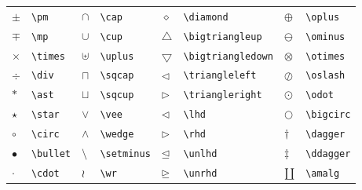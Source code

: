 \documentclass[fleqn]{profmat-cefet}
\begin{document}
\begin{spacing}{1}
\begin{longtable}{p{4mm}p{20mm}p{4mm}p{25mm}p{4mm}p{34mm}p{4mm}p{20mm}} \hline
  $\pm             $ & \lstinline!\pm!              &
  $\cap            $ & \lstinline!\cap!             &
  $\diamond        $ & \lstinline!\diamond!         &
  $\oplus          $ & \lstinline!\oplus!           \\
  $\mp             $ & \lstinline!\mp!              &
  $\cup            $ & \lstinline!\cup!             &
  $\bigtriangleup  $ & \lstinline!\bigtriangleup!   &
  $\ominus         $ & \lstinline!\ominus!          \\
  $\times          $ & \lstinline!\times!           &
  $\uplus          $ & \lstinline!\uplus!           &
  $\bigtriangledown$ & \lstinline!\bigtriangledown! &
  $\otimes         $ & \lstinline!\otimes!          \\
  $\div            $ & \lstinline!\div!             &
  $\sqcap          $ & \lstinline!\sqcap!           &
  $\triangleleft   $ & \lstinline!\triangleleft!    &
  $\oslash         $ & \lstinline!\oslash!          \\
  $\ast            $ & \lstinline!\ast!             &
  $\sqcup          $ & \lstinline!\sqcup!           &
  $\triangleright  $ & \lstinline!\triangleright!   &
  $\odot           $ & \lstinline!\odot!            \\
  $\star           $ & \lstinline!\star!            &
  $\vee            $ & \lstinline!\vee!             &
  $\lhd            $ & \lstinline!\lhd!             &
  $\bigcirc        $ & \lstinline!\bigcirc!         \\
  $\circ           $ & \lstinline!\circ!            &
  $\wedge          $ & \lstinline!\wedge!           &
  $\rhd            $ & \lstinline!\rhd!             &
  $\dagger         $ & \lstinline!\dagger!          \\
  $\bullet         $ & \lstinline!\bullet!          &
  $\setminus       $ & \lstinline!\setminus!        &
  $\unlhd          $ & \lstinline!\unlhd!           &
  $\ddagger        $ & \lstinline!\ddagger!         \\
  $\cdot           $ & \lstinline!\cdot!            &
  $\wr             $ & \lstinline!\wr!              &
  $\unrhd          $ & \lstinline!\unrhd!           &
  $\amalg          $ & \lstinline!\amalg!           \\ \hline
\end{longtable}


\end{spacing}
\end{document}
